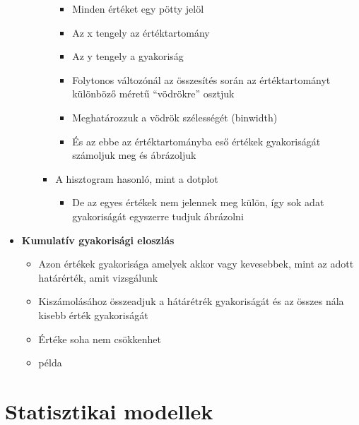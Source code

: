 \documentclass[
  letterpaper,
  DIV=11,
  numbers=noendperiod]{scrreprt}
\providecommand{\tightlist}{%
  \setlength{\itemsep}{0pt}\setlength{\parskip}{0pt}}\usepackage{longtable,booktabs,array}
\begin{document}
\begin{itemize}
\begin{itemize}
\begin{itemize}
      \begin{itemize}
      \item
        Minden értéket egy pötty jelöl
      \item
        Az x tengely az értéktartomány
      \item
        Az y tengely a gyakoriság
      \item
        Folytonos változónál az összesítés során az értéktartományt
        különböző méretű ``vödrökre'' osztjuk
      \item
        Meghatározzuk a vödrök szélességét (binwidth)
      \item
        És az ebbe az értéktartományba eső értékek gyakoriságát
        számoljuk meg és ábrázoljuk
      \end{itemize}
    \item
      A hisztogram hasonló, mint a dotplot

      \begin{itemize}
      \tightlist
      \item
        De az egyes értékek nem jelennek meg külön, így sok adat
        gyakoriságát egyszerre tudjuk ábrázolni
      \end{itemize}
    \end{itemize}
  \end{itemize}
\item
  \textbf{Kumulatív gyakorisági eloszlás}

  \begin{itemize}
  \item
    Azon értékek gyakorisága amelyek akkor vagy kevesebbek, mint az
    adott határérték, amit vizsgálunk
  \item
    Kiszámolásához összeadjuk a hátárétrék gyakoriságát és az összes
    nála kisebb érték gyakoriságát
  \item
    Értéke soha nem csökkenhet
  \item
    példa
  \end{itemize}
\end{itemize}

\hypertarget{statisztikai-modellek}{%
\section{Statisztikai modellek}\label{statisztikai-modellek}}
\end{document}
